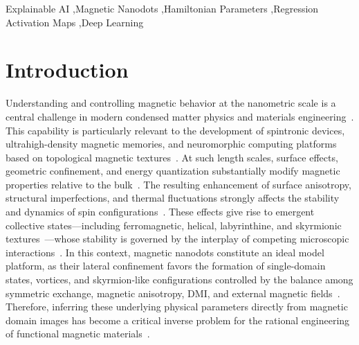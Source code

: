\documentclass[a4paper,fleqn]{cas-sc}
\begin{document}
\begin{keywords}
Explainable AI \sep Magnetic Nanodots \sep Hamiltonian Parameters \sep Regression Activation Maps \sep Deep Learning
\end{keywords}


\maketitle

\linenumbers


\section{Introduction}\label{sec:intro}

Understanding and controlling magnetic behavior at the nanometric scale is a central challenge in modern condensed matter physics and materials engineering~\cite{heinrich2021quantum}. This capability is particularly relevant to the development of spintronic devices, ultrahigh-density magnetic memories, and neuromorphic computing platforms based on topological magnetic textures~\cite{wang2022fundamental, fert2024electrical}. At such length scales, surface effects, geometric confinement, and energy quantization substantially modify magnetic properties relative to the bulk~\cite{issa2013magnetic}. The resulting enhancement of surface anisotropy, structural imperfections, and thermal fluctuations strongly affects the stability and dynamics of spin configurations~\cite{charalampidis2023metadynamics}. These effects give rise to emergent collective states—including ferromagnetic, helical, labyrinthine, and skyrmionic textures~\cite{yua2017magnetic, birch2020real, yu2021magnetic, zhang2023magnetic}—whose stability is governed by the interplay of competing microscopic interactions~\cite{tokura2020magnetic}. In this context, magnetic nanodots constitute an ideal model platform, as their lateral confinement favors the formation of single-domain states, vortices, and skyrmion-like configurations controlled by the balance among symmetric exchange, magnetic anisotropy, DMI, and external magnetic fields~\cite{zelent2023stabilization, rohart2013skyrmion}. Therefore, inferring these underlying physical parameters directly from magnetic domain images has become a critical inverse problem for the rational engineering of functional magnetic materials~\cite{kong2023quantifying}.
\end{document}
